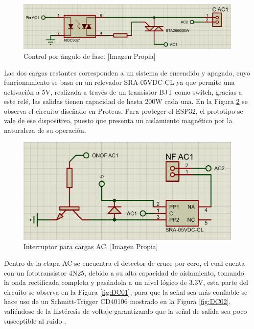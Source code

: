 		\begin{figure}[H]
			\centering
			\caption[Control por ángulo de fase.]{Control por ángulo de fase.  [Imagen Propia]}
			\label{fig:CAC1}
			\includegraphics[width=0.8\linewidth]{Imagenes/CAC1}
		\end{figure}
	
		Las dos cargas restantes corresponden a un sistema de encendido y apagado, cuyo funcionamiento se basa en un relevador SRA-05VDC-CL ya que permite una activación a 5V, realizada a través de un transistor BJT como switch, gracias a este relé, las salidas tienen capacidad de hasta 200W cada una. En la Figura \ref{fig:ONOFAC} se observa el circuito diseñado en Proteus. Para proteger el ESP32, el prototipo se vale de ese dispositivo, puesto que presenta un aislamiento magnético por la naturaleza de su operación.\\
	
		\begin{figure}[H]
			\centering
			\caption[Interruptor para cargas AC.]{Interruptor para cargas AC.  [Imagen Propia]}
			\label{fig:ONOFAC}
			\includegraphics[width=0.7\linewidth]{Imagenes/ONOFAC}
		\end{figure}
	
		Dentro de la etapa AC se encuentra el detector de cruce por cero, el cual cuenta con un fototransistor 4N25, debido a su alta capacidad de aislamiento, tomando la onda rectificada completa y pasándola a un nivel lógico de 3.3V, esta parte del circuito se observa en la Figura \ref{fig:DC01}; para que la señal sea más confiable se hace uso de un Schmitt-Trigger CD40106 mostrado en la Figura \ref{fig:DC02}, valiéndose de la histéresis de voltaje garantizando que la señal de salida sea poco susceptible al ruido \cite{DC0}.\\
		
